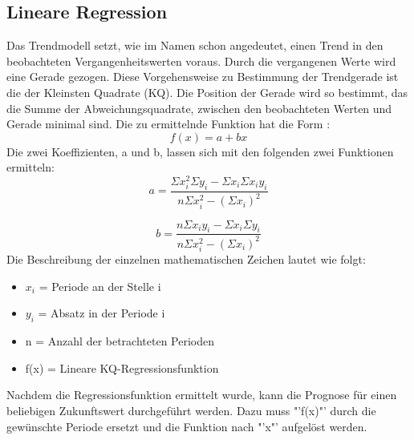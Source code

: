 \subsection{Lineare Regression}
Das Trendmodell setzt, wie im Namen schon angedeutet, einen Trend in den beobachteten Vergangenheitswerten voraus. Durch die vergangenen Werte wird eine Gerade gezogen. Diese Vorgehensweise zu Bestimmung der Trendgerade ist die der Kleinsten Quadrate (KQ).
Die Position der Gerade wird so bestimmt, das die Summe der Abweichungsquadrate, zwischen den beobachteten Werten und Gerade minimal sind. Die zu ermittelnde Funktion hat die Form \cite{schwarze2009}:
\begin{equation}
	f(x) = a + bx
\end{equation}
Die zwei Koeffizienten, a und b, lassen sich mit den folgenden zwei Funktionen ermitteln:
\begin{equation}
	a = \dfrac{\Sigma x^{2}_{i} \Sigma y_{i} - \Sigma x_{i} \Sigma x_{i}y_{i}}{n \Sigma x^{2}_{i} - (\Sigma x_{i})^{2}}
\end{equation}

\begin{equation}
	b = \dfrac{n\Sigma x_{i}y_{i} - \Sigma x_{i} \Sigma y_{i}}{n \Sigma x^{2}_{i} - (\Sigma x_{i})^{2}}
\end{equation}
Die Beschreibung der einzelnen mathematischen Zeichen lautet wie folgt:
\begin{itemize}
	\item \(x_{i}\) = Periode an der Stelle i
	\item \(y_{i}\) = Absatz in der Periode i
	\item n = Anzahl der betrachteten Perioden
	\item f(x) = Lineare KQ-Regressionsfunktion
\end{itemize}
Nachdem die Regressionsfunktion ermittelt wurde, kann die Prognose für einen beliebigen Zukunftswert durchgeführt werden. Dazu muss "'f(x)"' durch die gewünschte Periode ersetzt und die Funktion nach "'x"' aufgelöst werden.

